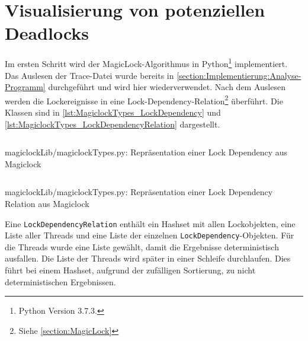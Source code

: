 \section{Visualisierung von potenziellen Deadlocks}
\label{section:Implementierung:Visualisierung von potenziellen Deadlocks}
Im ersten Schritt wird der MagicLock-Algorithmus in Python\footnote{Python
Version 3.7.3.} implementiert. Das Auslesen der Trace-Datei wurde bereits in
\cref{section:Implementierung:Analyse-Programm} durchgeführt und wird hier
wiederverwendet. Nach dem Auslesen werden die Lockereignisse in eine
Lock-Dependency-Relation\footnote{Siehe \cref{section:MagicLock}} überführt. Die
Klassen sind in \cref{lst:MagiclockTypes_LockDependency} und
\cref{lst:MagiclockTypes_LockDependencyRelation} dargestellt.
\begin{listing}[ht]
  \inputminted[frame=lines,linenos,firstline=45,lastline=49]{python}{./Python/magiclockLib/magiclockTypes.py}
  \caption{magiclockLib/magiclockTypes.py: Repräsentation einer \textrm{Lock Dependency} aus Magiclock \autocite[3]{MagicLock}}
  \label{lst:MagiclockTypes_LockDependency}
\end{listing}
\begin{listing}[ht]
  \inputminted[frame=lines,linenos,firstline=67,lastline=77]{python}{./Python/magiclockLib/magiclockTypes.py}
  \caption{magiclockLib/magiclockTypes.py: Repräsentation einer \textrm{Lock Dependency Relation} aus Magiclock \autocite[3]{MagicLock}}
  \label{lst:MagiclockTypes_LockDependencyRelation}
\end{listing}
Eine \texttt{Lock\-Dependency\-Relation} enthält ein Hashset mit allen
Lockobjekten, eine Liste aller Threads und eine Liste der einzelnen
\texttt{Lock\-Dependency}-Objekten. Für die Threads wurde eine Liste gewählt,
damit die Ergebnisse deterministisch ausfallen. Die Liste der Threads wird
später in einer Schleife durchlaufen. Dies führt bei einem Hashset, aufgrund der
zufälligen Sortierung, zu nicht deterministischen Ergebnissen.

